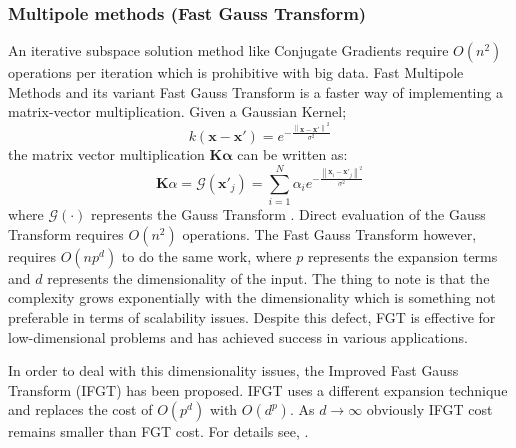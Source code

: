 \documentclass{article}
\begin{document}
\subsubsection{Multipole methods (Fast Gauss Transform)}
An iterative subspace solution method like Conjugate Gradients require $O(n^2)$ operations per iteration which is prohibitive with big data. Fast Multipole Methods and its variant Fast Gauss Transform is a faster way of implementing a matrix-vector multiplication. Given a Gaussian Kernel;
\begin{equation}
k(\mathbf{x}-\mathbf{x'})=e^{-\frac{\left \| \mathbf{x}-\mathbf{x'} \right \|^2}{\sigma^2}}
\end{equation}
the matrix vector multiplication $\mathbf{K}\mathbf{\alpha}$ can be written as:
\begin{equation}
\mathbf{K}\alpha=\mathcal{G}(\mathbf{x'}_j)=\sum_{i=1}^N\alpha_ie^{-\frac{\left \| \mathbf{x}_i-\mathbf{x'}_j \right \|^2}{\sigma^2}}
\end{equation}
where $\mathcal{G}(\cdot)$ represents the Gauss Transform \cite{FGTkernel}. Direct evaluation of the Gauss Transform requires $O(n^2)$ operations. The Fast Gauss Transform however, requires $O(np^d)$ to do the same work, where $p$ represents the expansion terms and $d$ represents the dimensionality of the input. The thing to note is that the complexity grows exponentially with the dimensionality which is something not preferable in terms of scalability issues.  Despite this defect, FGT is effective for low-dimensional problems and has achieved success in various applications. 

In order to deal with this dimensionality issues, the Improved Fast Gauss Transform (IFGT) has  been proposed. IFGT uses a different expansion technique and replaces the cost of $O(p^d)$ with $O(d^p)$. As $d\rightarrow \infty$ obviously IFGT cost remains smaller than FGT cost. For details see, \cite{FGTkernel}.
\end{document}
